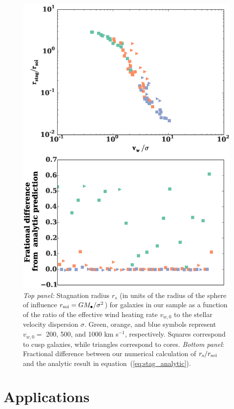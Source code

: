 \documentclass[usenatbib,fleqn]{mn2e}
\begin{document}
\begin{figure}
  \includegraphics[width=\columnwidth]{rs.eps}
  \caption{\label{fig:stag} \emph{Top panel:} Stagnation radius
    $r_{s}$ (in units of the radius of the sphere of influence $r_{\rm
      soi} = GM_{\bullet}/\sigma^{2}$) for galaxies in our sample as a
    function of the ratio of the effective wind heating rate $v_{w,0}$
    to the stellar velocity dispersion $\sigma$.  Green, orange, and
    blue symbols represent $v_{w,0} =$ 200, 500, and 1000 km s$^{-1}$,
    respectively.  Squares correspond to cusp galaxies, while
    triangles correspond to cores. \emph{Bottom panel}: Fractional
    difference between our numerical calculation of $r_{\rm s}/r_{\rm
      soi}$ and the analytic result in
    equation~(\ref{eq:stag_analytic}). }
\end{figure}



\section{Applications}
\label{sec:applications}
\end{document}
